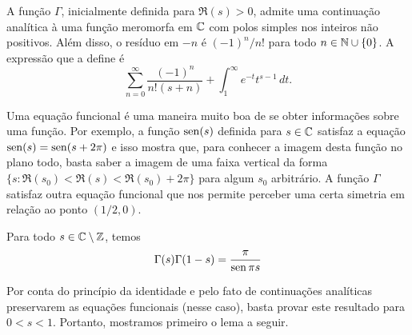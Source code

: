     \begin{teorema}
    \label{teo-cont-meromorfa-gamma2}
        A função $\Gamma$, inicialmente definida para $\Re(s) > 0$, admite uma continuação analítica à uma função meromorfa em $\mathbb{C}$ com polos simples nos inteiros não positivos. Além disso, o resíduo em $-n$ é $(-1)^{n}/n!$ para todo $n \in \mathbb{N} \cup \{0\}$. A expressão que a define é
        $$\sum_{n=0}^{\infty} \frac{(-1)^n}{n!(s+n)} + \int_{1}^{\infty}e^{-t}t^{s-1} \, dt.$$
    \end{teorema}
    
    Uma equação funcional é uma maneira muito boa de se obter informações sobre uma função. Por exemplo, a função $\operatorname{sen}(s)$ definida para $s \in \mathbb{C}$ satisfaz a equação $\operatorname{sen}(s) = \operatorname{sen}(s + 2\pi)$ e isso mostra que, para conhecer a imagem desta função no plano todo, basta saber a imagem de uma faixa vertical da forma $\{s : \Re(s_0) < \Re(s) < \Re(s_0) + 2\pi\}$ para algum $s_0$ arbitrário. A função $\Gamma$ satisfaz outra equação funcional que nos permite perceber uma certa simetria em relação ao ponto $(1/2,0)$. 
    
    \begin{teorema}
    Para todo $s \in \mathbb{C} \setminus \mathbb{Z}$, temos 
    $$\Gamma(s)\Gamma(1-s) = \frac{\pi}{\operatorname{sen} \pi s}$$
    \end{teorema}
    
    Por conta do princípio da identidade e pelo fato de continuações analíticas preservarem as equações funcionais (nesse caso), basta provar este resultado para $0<s<1$. Portanto, mostramos primeiro o lema a seguir.
    
